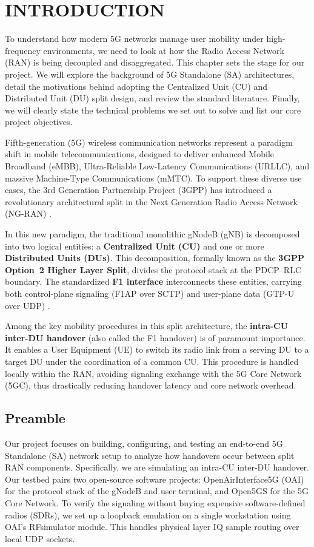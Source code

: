 \chapter{INTRODUCTION}

\justify
To understand how modern 5G networks manage user mobility under high-frequency environments, we need to look at how the Radio Access Network (RAN) is being decoupled and disaggregated. This chapter sets the stage for our project. We will explore the background of 5G Standalone (SA) architectures, detail the motivations behind adopting the Centralized Unit (CU) and Distributed Unit (DU) split design, and review the standard literature. Finally, we will clearly state the technical problems we set out to solve and list our core project objectives.

Fifth-generation (5G) wireless communication networks represent a paradigm shift in mobile telecommunications, designed to deliver enhanced Mobile Broadband (eMBB), Ultra-Reliable Low-Latency Communications (URLLC), and massive Machine-Type Communications (mMTC). To support these diverse use cases, the 3rd Generation Partnership Project (3GPP) has introduced a revolutionary architectural split in the Next Generation Radio Access Network (NG-RAN) \cite{3gpp_ts38300}.

In this new paradigm, the traditional monolithic gNodeB (gNB) is decomposed into two logical entities: a \textbf{Centralized Unit (CU)} and one or more \textbf{Distributed Units (DUs)}. This decomposition, formally known as the \textbf{3GPP Option~2 Higher Layer Split}, divides the protocol stack at the PDCP--RLC boundary. The standardized \textbf{F1 interface} interconnects these entities, carrying both control-plane signaling (F1AP over SCTP) and user-plane data (GTP-U over UDP) \cite{3gpp_ts38473}.

Among the key mobility procedures in this split architecture, the \textbf{intra-CU inter-DU handover} (also called the F1 handover) is of paramount importance. It enables a User Equipment (UE) to switch its radio link from a serving DU to a target DU under the coordination of a common CU. This procedure is handled locally within the RAN, avoiding signaling exchange with the 5G Core Network (5GC), thus drastically reducing handover latency and core network overhead.


\section{Preamble}
\justify
Our project focuses on building, configuring, and testing an end-to-end 5G Standalone (SA) network setup to analyze how handovers occur between split RAN components. Specifically, we are simulating an intra-CU inter-DU handover. Our testbed pairs two open-source software projects: OpenAirInterface5G (OAI) for the protocol stack of the gNodeB and user terminal, and Open5GS for the 5G Core Network. To verify the signaling without buying expensive software-defined radios (SDRs), we set up a loopback emulation on a single workstation using OAI's RFsimulator module. This handles physical layer IQ sample routing over local UDP sockets.


